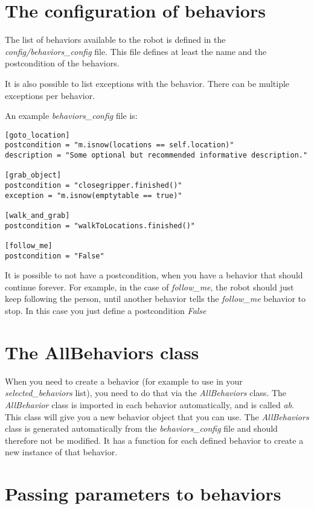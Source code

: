 \documentclass[a4paper, 10pt, oneside]{article}
\newcommand{\cod}[1]{\emph{#1}}
\begin{document}
\section{The configuration of behaviors}

The list of behaviors available to the robot is defined in the \cod{config/behaviors\_config} file.
This file defines at least the name and the postcondition of the behaviors.

It is also possible to list exceptions with the behavior. There can be multiple exceptions per
behavior.

An example \cod{behaviors\_config} file is:

\begin{verbatim}
[goto_location]
postcondition = "m.isnow(locations == self.location)"
description = "Some optional but recommended informative description."

[grab_object]
postcondition = "closegripper.finished()"
exception = "m.isnow(emptytable == true)"

[walk_and_grab]
postcondition = "walkToLocations.finished()"

[follow_me]
postcondition = "False"
\end{verbatim}

It is possible to not have a postcondition, when you have a behavior that should continue forever.
For example, in the case of \cod{follow\_me}, the robot should just keep following the person, until
another behavior tells the \cod{follow\_me} behavior to stop. In this case you just define a
postcondition \cod{False}



\section{The AllBehaviors class}

When you need to create a behavior (for example to use in your \cod{selected\_behaviors} list), you
need to do that via the \cod{AllBehaviors} class. The \cod{AllBehavior} class is imported in each
behavior automatically, and is called \cod{ab}. This class will give you a new behavior object that
you can use. The \cod{AllBehaviors} class is generated automatically from the
\cod{behaviors\_config} file and should therefore not be modified. It has a function for each
defined behavior to create a new instance of that behavior.


\section{Passing parameters to behaviors}
\end{document}
